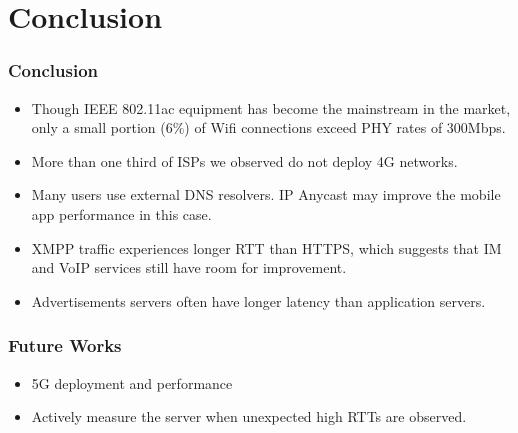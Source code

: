 \section{Conclusion}

\begin{frame}
    \frametitle{Conclusion}
    \begin{itemize}
        \setlength{\itemsep}{1.1em}
        \item Though IEEE 802.11ac equipment has become the mainstream in the market, only a small portion (6\%) of Wifi connections exceed PHY rates of 300Mbps.
        \item More than one third of ISPs we observed do not deploy 4G networks.
        \item Many users use external DNS resolvers. IP Anycast may improve the mobile app performance in this case.
        \item XMPP traffic experiences longer RTT than HTTPS, which suggests that IM and VoIP services still have room for improvement.
        \item Advertisements servers often have longer latency than application servers.
    \end{itemize}
\end{frame}

\begin{frame}
    \frametitle{Future Works}

    \begin{itemize}
        \setlength{\itemsep}{1.4em}
        \item 5G deployment and performance
        \item Actively measure the server when unexpected high RTTs are observed.
    \end{itemize}
\end{frame}